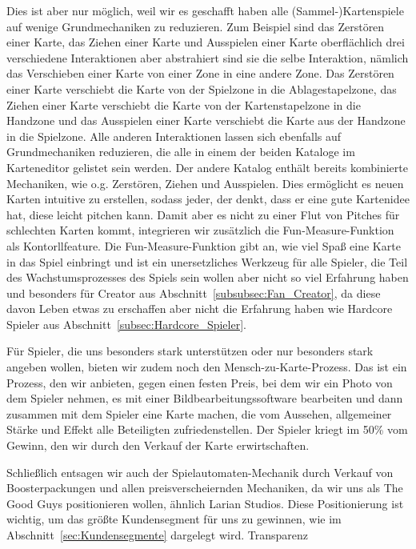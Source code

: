 \documentclass[fontsize=12, a4aper]{scrartcl}
\begin{document}
\noindent Dies ist aber nur möglich, weil wir es geschafft haben alle (Sammel-)Kartenspiele auf wenige Grundmechaniken zu reduzieren. Zum Beispiel sind das Zerstören einer Karte, das Ziehen einer Karte und Ausspielen einer Karte oberflächlich drei verschiedene Interaktionen aber abstrahiert sind sie die selbe Interaktion, nämlich das Verschieben einer Karte von einer Zone in eine andere Zone. Das Zerstören einer Karte verschiebt die Karte von der Spielzone in die Ablagestapelzone, das Ziehen einer Karte verschiebt die Karte von der Kartenstapelzone in die Handzone und das Ausspielen einer Karte verschiebt die Karte aus der Handzone in die Spielzone. Alle anderen Interaktionen lassen sich ebenfalls auf Grundmechaniken reduzieren, die alle in einem der beiden Kataloge im Karteneditor gelistet sein werden. Der andere Katalog enthält bereits kombinierte Mechaniken, wie o.g. Zerstören, Ziehen und Ausspielen. Dies ermöglicht es neuen Karten intuitive zu erstellen, sodass jeder, der denkt, dass er eine gute Kartenidee hat, diese leicht pitchen kann. Damit aber es nicht zu einer Flut von Pitches für schlechten Karten kommt, integrieren wir zusätzlich die \glqq Fun-Measure-Funktion\grqq{} als Kontorllfeature. Die \glqq Fun-Measure-Funktion\grqq{} gibt an, wie viel Spaß eine Karte in das Spiel einbringt und ist ein unersetzliches Werkzeug für alle Spieler, die Teil des Wachstumsprozesses des Spiels sein wollen aber nicht so viel Erfahrung haben und besonders für \glqq Creator\grqq{} aus Abschnitt~\ref{subsubsec:Fan_Creator}, da diese davon Leben etwas zu erschaffen aber nicht die Erfahrung haben wie \glqq Hardcore Spieler\grqq{} aus Abschnitt~\ref{subsec:Hardcore_Spieler}.\hfill\newline

\noindent Für Spieler, die uns besonders stark unterstützen oder nur besonders stark angeben wollen, bieten wir zudem noch den \glqq Mensch-zu-Karte-Prozess\grqq{}. Das ist ein Prozess, den wir anbieten, gegen einen festen Preis, bei dem wir ein Photo von dem Spieler nehmen, es mit einer Bildbearbeitungssoftware bearbeiten und dann zusammen mit dem Spieler eine Karte machen, die vom Aussehen, allgemeiner Stärke und Effekt alle Beteiligten zufriedenstellen. Der Spieler kriegt im 50\% vom Gewinn, den wir durch den Verkauf der Karte erwirtschaften.


\noindent Schließlich entsagen wir auch der Spielautomaten-Mechanik durch Verkauf von Boosterpackungen und allen preisverscheiernden Mechaniken, da wir uns als \glqq The Good Guys \grqq positionieren wollen, ähnlich Larian Studios. Diese Positionierung ist wichtig, um das größte Kundensegment für uns zu gewinnen, wie im Abschnitt~\ref{sec:Kundensegmente} dargelegt wird. Transparenz\hfill\newline
\end{document}
